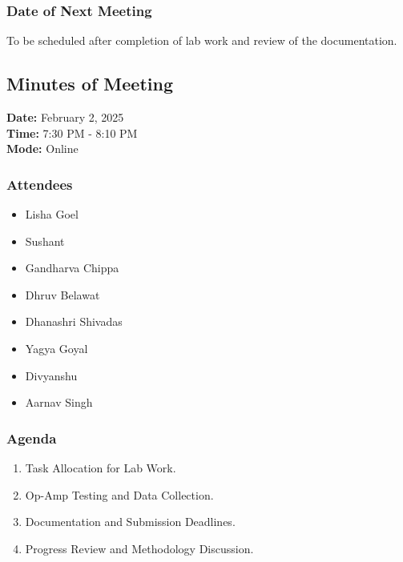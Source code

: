 \documentclass[12pt,a4paper]{article}
\begin{document}
\subsubsection*{Date of Next Meeting}
To be scheduled after completion of lab work and review of the documentation.


\subsection*{Minutes of Meeting}
\textbf{Date:} February 2, 2025\\
\textbf{Time:} 7:30 PM - 8:10 PM\\
\textbf{Mode:} Online\\

\subsubsection*{Attendees}
\begin{itemize}
    \item Lisha Goel
    \item Sushant
    \item Gandharva Chippa
    \item Dhruv Belawat
    \item Dhanashri Shivadas
    \item Yagya Goyal
    \item Divyanshu
    \item Aarnav Singh
\end{itemize}

\subsubsection*{Agenda}
\begin{enumerate}
    \item Task Allocation for Lab Work.
    \item Op-Amp Testing and Data Collection.
    \item Documentation and Submission Deadlines.
    \item Progress Review and Methodology Discussion.
\end{enumerate}
\end{document}
